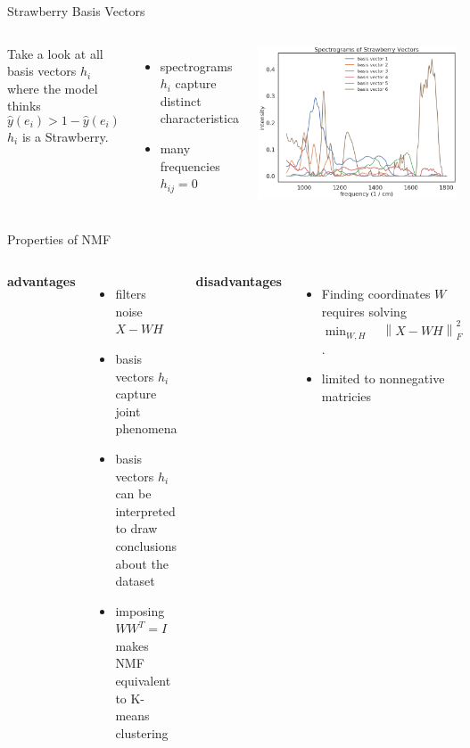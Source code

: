\documentclass[aspectratio=169]{beamer}
\begin{document}
\begin{frame}{Strawberry Basis Vectors}

	\begin{columns}
		Take a look at all basis vectors $h_i$ where the model thinks 
		\begin{equation*}
		\hat{y}(e_i) > 1 - \hat{y}(e_i)
		\end{equation*}
		$h_i$ is a Strawberry.
		\begin{itemize}
		\item spectrograms $h_i$ capture distinct characteristica
		\item many frequencies $h_{i j} = 0$
		\end{itemize}

			\includegraphics[width=\linewidth]{images/strawberry_basis_vectors.png}
	\end{columns}
\end{frame}

\begin{frame}{Properties of NMF}
	\begin{columns}[t]

	\column{0.55 \textwidth}
	\textbf{advantages}
	\begin{itemize}
	\item filters noise $X - W H $
	\item basis vectors $h_i$ capture joint phenomena
	\item basis vectors $h_i$ can be interpreted to draw conclusions about the dataset
	\item imposing $W W^T  = I $ makes NMF equivalent to K-means clustering
	\end{itemize}
	\column{0.45 \textwidth}
	\textbf{disadvantages}
	\begin{itemize}
	\item Finding coordinates $W$ requires solving $\min_{ W, H }  \quad \left\lVert X - W H\right\rVert^2_F$.
	\item limited to nonnegative matricies
	\end{itemize}
	\end{columns}
\end{frame}
\end{document}
